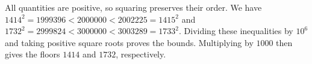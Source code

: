 All quantities are positive, so squaring preserves their order. We have $1414^2=1999396<2000000<2002225=1415^2$ and $1732^2=2999824<3000000<3003289=1733^2$. Dividing these inequalities by $10^6$ and taking positive square roots proves the bounds. Multiplying by $1000$ then gives the floors $\boxed{1414}$ and $\boxed{1732}$, respectively.
